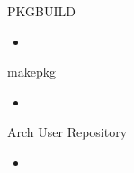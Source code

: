\begin{slide}{PKGBUILD}
	\begin{itemize}
		\item{}
	\end{itemize}
\end{slide}

\begin{slide}{makepkg}
	\begin{itemize}
		\item{}
	\end{itemize}
\end{slide}

\begin{slide}{Arch User Repository}
	\begin{itemize}
		\item{}
	\end{itemize}
\end{slide}

